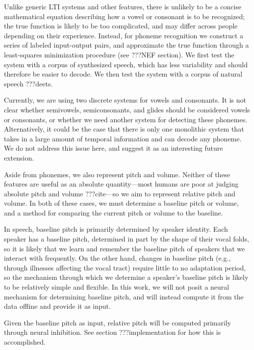 Unlike generic LTI systems and other features,
there is unlikely to be a concise mathematical equation
describing how a vowel or consonant is to be recognized;
the true function is likely to be too complicated,
and may differ across people depending on their experience.
Instead, for phoneme recognition
we construct a series of labeled input-output pairs,
and approximate the true function
through a least-squares minimization procedure
(see ???NEF section).
We first test the system
with a corpus of synthesized speech,
which has less variability and should therefore
be easier to decode.
We then test the system
with a corpus of natural speech
???deets.


Currently, we are using two discrete systems
for vowels and consonants.
It is not clear whether
semivowels, semiconsonants, and glides
should be considered vowels or consonants,
or whether we need another system
for detecting these phonemes.
Alternatively, it could be the case
that there is only one monolithic system
that takes in a large amount of temporal information
and can decode any phoneme.
We do not address this issue here,
and suggest it as an interesting future extension.

Aside from phonemes, we also represent pitch and volume.
Neither of these features are useful
as an absolute quantity---most humans are poor
at judging absolute pitch and volume ???cite---so
we aim to represent relative pitch and volume.
In both of these cases,
we must determine a baseline pitch or volume,
and a method for comparing the current
pitch or volume to the baseline.

In speech, baseline pitch is primarily determined
by speaker identity.
Each speaker has a baseline pitch,
determined in part by the shape of their vocal folds,
so it is likely that we learn
and remember the baseline pitch
of speakers that we interact with frequently.
On the other hand,
changes in baseline pitch
(e.g., through illnesses affecting the vocal tract)
require little to no adaptation period,
so the mechanism through which we determine
a speaker's baseline pitch
is likely to be relatively simple
and flexible.
In this work,
we will not posit a neural mechanism
for determining baseline pitch,
and will instead compute it
from the data offline and provide it as input.

Given the baseline pitch as input,
relative pitch will be computed
primarily through neural inhibition.
See section ???implementation
for how this is accomplished.

